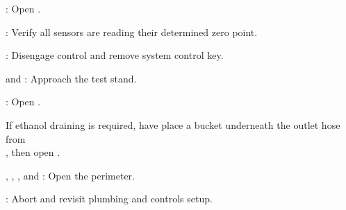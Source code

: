\begin{checklist}
    \item \rlcs{}: Open \purge{}. 
    \item \daq{}: Verify all sensors are reading their determined zero point. 
    \item \rlcs{}: Disengage control and remove system control key. 
    \item \primary{} and \secondary{}: Approach the test stand. 
    \item \primary{}: Open \pdrain{}. 
    \begin{checklist}[label=$\bullet$]
            \item If ethanol draining is required, have \primary{} place a bucket underneath the outlet hose from \\ \phantom{} \hspace{7ex} \fdrain{}, then open \fdrain{}. 
    \end{checklist}
    \item \peri{}, \perii{}, \periii{}, and \periv{}: Open the perimeter. 
    \item \ops{}: Abort and revisit plumbing and controls setup.
\end{checklist}

\newpage
